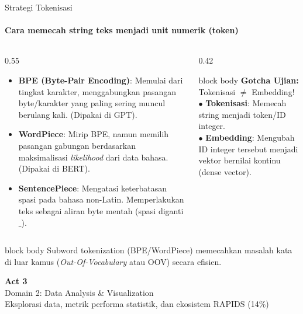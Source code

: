 \documentclass[aspectratio=169,t]{beamer}
\newcommand{\acttitle}[3]{%
  \begin{frame}[plain]
    \vspace{1.5cm}
    \begin{center}
      {\color{nvgreen}\Huge\bfseries Act #1}\\[1.2em]
      {\color{nvwhite}\Huge #2}\\[0.8em]
      {\color{nvgray}\Large #3}
    \end{center}
  \end{frame}%
}
\newcommand{\takeaway}[1]{%
  \vspace{0.1em}
  \begin{beamercolorbox}[rounded=true,shadow=false,sep=5pt]{block body}
    \centering\footnotesize\color{nvlightgreen}#1
  \end{beamercolorbox}%
}
\begin{document}
\begin{frame}{Strategi Tokenisasi}
  \framesubtitle{Cara memecah string teks menjadi unit numerik (token)}
  \begin{columns}[T]
    \begin{column}{0.55\textwidth}
      \begin{itemize}\small
        \item \textbf{BPE (Byte-Pair Encoding)}: Memulai dari tingkat karakter, menggabungkan pasangan byte/karakter yang paling sering muncul berulang kali. (Dipakai di GPT).
        \item \textbf{WordPiece}: Mirip BPE, namun memilih pasangan gabungan berdasarkan maksimalisasi \emph{likelihood} dari data bahasa. (Dipakai di BERT).
        \item \textbf{SentencePiece}: Mengatasi keterbatasan spasi pada bahasa non-Latin. Memperlakukan teks sebagai aliran byte mentah (spasi diganti $\_$).
      \end{itemize}
    \end{column}
    \begin{column}{0.42\textwidth}
      \begin{center}
      \begin{beamercolorbox}[rounded=true,shadow=false,sep=8pt]{block body}
        {\footnotesize\color{nvlightgreen}\textbf{Gotcha Ujian:}}
        \vspace{0.3em}
        {\scriptsize\color{nvwhite}Tokenisasi $\neq$ Embedding!\\
        $\bullet$ \textbf{Tokenisasi}: Memecah string menjadi token/ID integer.\\
        $\bullet$ \textbf{Embedding}: Mengubah ID integer tersebut menjadi vektor bernilai kontinu (dense vector).}
      \end{beamercolorbox}
      \end{center}
    \end{column}
  \end{columns}
  \takeaway{Subword tokenization (BPE/WordPiece) memecahkan masalah kata di luar kamus (\emph{Out-Of-Vocabulary} atau OOV) secara efisien.}
\end{frame}

\acttitle{3}{Domain 2: Data Analysis \& Visualization}{Eksplorasi data, metrik performa statistik, dan ekosistem RAPIDS (14\%)}
\end{document}
